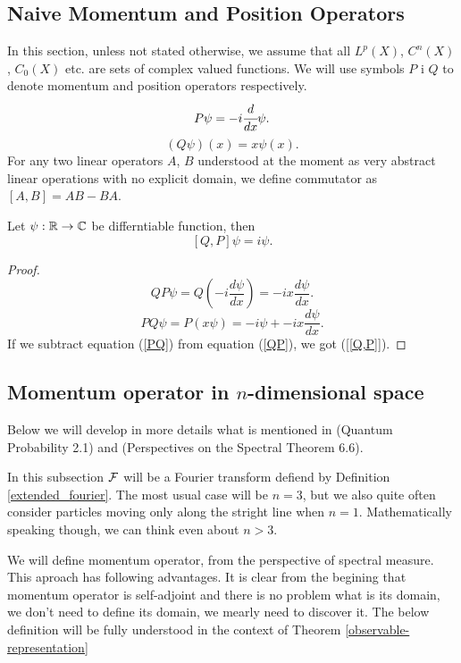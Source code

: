 \documentclass[main.tex]{subfiles}
\begin{document}
\subsection{Naive Momentum and Position Operators}
In this section, unless not stated otherwise, we assume that all $L^p(X)$, $C^n(X)$, $C_0(X)$ etc. are sets of complex valued functions.
We will use symbols $P$ i $Q$ to denote momentum and position operators respectively.
\begin{equation}
    P\psi = -i\cfrac{d}{dx}\psi.
\end{equation}
\begin{equation}
    (Q\psi)(x) = x\psi(x).
\end{equation}
For any two linear operators $A$, $B$ understood at the moment as very abstract linear operations with no explicit domain, we define commutator as $[A, B] = AB - BA$.
\begin{theorem}
Let $\psi:\mathbb{R}\to\mathbb{C}$ be differntiable function, then
\begin{equation}
\label{[Q,P]}
    [Q, P]\psi = i\psi.
\end{equation}
\end{theorem}
\begin{proof}
\begin{equation}\label{QP}
    QP\psi = Q(-i\frac{d\psi}{dx}) = -ix\frac{d\psi}{dx}.
\end{equation}
\begin{equation}
\label{PQ}
    PQ\psi = P(x\psi) = -i\psi + -ix\frac{d\psi}{dx}.
\end{equation}
If we subtract equation (\ref{PQ}) from equation (\ref{QP}), we got (\ref{[Q,P]}).
\end{proof}
\subsection{Momentum operator in $n$-dimensional space}
Below we will develop in more details what is mentioned in \cite{breure-petruccione2002} (Quantum Probability 2.1) and \cite{hall2013} (Perspectives on the Spectral Theorem 6.6).

In this subsection $\mathcal{F}$ will be a Fourier transform defiend by Definition \ref{extended_fourier}.
The most usual case will be $n=3$, but we also quite often consider particles moving only along the stright line when $n=1$. Mathematically speaking though, we can think even about $n > 3$.

We will define momentum operator, from the perspective of spectral measure. This aproach has following advantages. It is clear from the begining that momentum operator is self-adjoint and there is no problem what is its domain, we don't need to define its domain, we mearly need to discover it. The below definition will be fully understood in the context of Theorem \ref{observable-representation}
\end{document}
